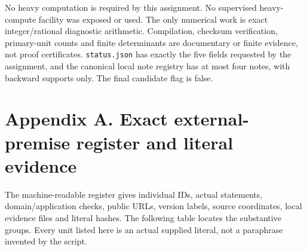 \documentclass[
  10pt,
]{article}
\begin{document}
No heavy computation is required by this assignment. No supervised
heavy-compute facility was exposed or used. The only numerical work is
exact integer/rational diagnostic arithmetic. Compilation, checksum
verification, primary-unit counts and finite determinants are
documentary or finite evidence, not proof certificates.
\texttt{status.json} has exactly the five fields requested by the
assignment, and the canonical local note registry has at most four
notes, with backward supports only. The final candidate flag is false.

\section{Appendix A. Exact external-premise register and literal
evidence}\label{appendix-a.-exact-external-premise-register-and-literal-evidence}

The machine-readable register gives individual IDs, actual statements,
domain/application checks, public URLs, version labels, source
coordinates, local evidence files and literal hashes. The following
table locates the substantive groups. Every unit listed here is an
actual supplied literal, not a paraphrase invented by the script.
\end{document}
